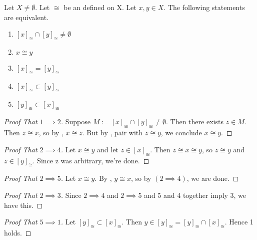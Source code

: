 \begin{prop}
    \label{prop:EquivalenceClassesPartition}
    
    Let $X \neq \emptyset$. 
    Let $\cong$ be an 
	\EquivalenceRelation
	defined on X. 
    Let $x,y \in X$. 
    The following statements are equivalent. 
    \begin{enumerate}
        \item $[x]_{\cong}  \cap [y]_{\cong} \neq \emptyset$
        \item $x \cong y$
        \item $[x]_{\cong} = [y]_{\cong}$
        \item $[x]_{\cong} \subset [y]_{\cong}$
        \item $[y]_{\cong} \subset [x]_{\cong}$ 
    \end{enumerate}
    
\begin{proof}[Proof That $1 \implies 2$]
Suppose $M:=[x]_{\cong} \cap [y]_{\cong} \neq \emptyset$. 
Then there exists $z \in M$.
Then $z \cong x$, so by \RelationSymmetry, $x \cong z$. 
But by \RelationTransitivity, pair with $z \cong y$, we conclude $x \cong y$. 
\end{proof}
\begin{proof}[Proof That $2 \implies 4$]
    Let $x \cong y$ and let $z \in [x]_{\cong}$. 
    Then $z \cong x \cong y$, so $z \cong y$ and $z \in [y]_{\cong}$.
    Since z was arbitrary, we're done. 
\end{proof}
\begin{proof}[Proof That $2 \implies 5$]
    Let $x \cong y$. By 
	\RelationSymmetry, $y \cong x$, so by $(2 \implies 4)$, we are done. 
\end{proof}
\begin{proof}[Proof That $2 \implies 3$]
    Since  $2 \implies 4$ and $2 \implies 5$ and 5 and 4 together imply 3, we have this. 
\end{proof}
\begin{proof}[Proof That $5 \implies 1$]
    Let $[y]_{\cong} \subset [x]_{\cong}$. 
    Then $y \in [y]_{\cong} = [y]_{\cong} \cap [x]_{\cong} $.
    Hence 1 holds. 
\end{proof}

\end{prop} 
